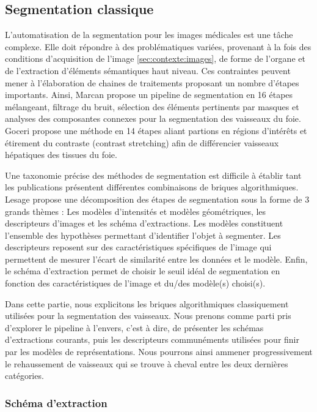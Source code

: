 \subsection{Segmentation classique}
\label{sec:EA:segmentation_historique}
% 
L'automatisation de la segmentation pour les images médicales est une tâche complexe. Elle doit répondre à des problématiques variées, provenant à la fois des conditions d'acquisition de l'image \ref{sec:contexte:images}, de forme de l'organe et de l'extraction d'éléments sémantiques haut niveau. Ces contraintes peuvent mener à l'élaboration de chaines de traitements proposant un nombre d'étapes importants. Ainsi, Marcan \cite{Marcan2014_vessel_seg} propose un pipeline de segmentation en 16 étapes mélangeant, filtrage du bruit, sélection des éléments pertinents par masques et analyses des composantes connexes pour la segmentation des vaisseaux du foie. Goceri \cite{Goceri2017_vessel} propose une méthode en 14 étapes aliant partions en régions d'intérêts et étirement du contraste (contrast stretching) afin de différencier vaisseaux hépatiques des tissues du foie.

Une taxonomie précise des méthodes de segmentation est difficile à établir tant les publications présentent différentes combinaisons de briques algorithmiques. Lesage \cite{Lesage2009_review} propose une décomposition des étapes de segmentation sous la forme de 3 grands thèmes : Les modèles d'intensités et modèles géométriques, les descripteurs d'images et les schéma d'extractions. Les modèles constituent l'ensemble des hypothèses permettant d'identifier l'objet à segmenter. Les descripteurs reposent sur des caractéristiques spécifiques de l'image qui permettent de mesurer l'écart de similarité entre les données et le modèle. Enfin, le schéma d'extraction permet de choisir le seuil idéal de segmentation en fonction des caractéristiques de l'image et du/des modèle(s) choisi(s).

Dans cette partie, nous explicitons les briques algorithmiques classiquement utilisées pour la segmentation des vaisseaux. Nous prenons comme parti pris d'explorer le pipeline à l'envers, c'est à dire, de présenter les schémas d'extractions courants, puis les descripteurs communéments utilisées pour finir par les modèles de représentations. Nous pourrons ainsi ammener progressivement le rehaussement de vaisseaux qui se trouve à cheval entre les deux dernières catégories.

\subsubsection{Schéma d'extraction}

